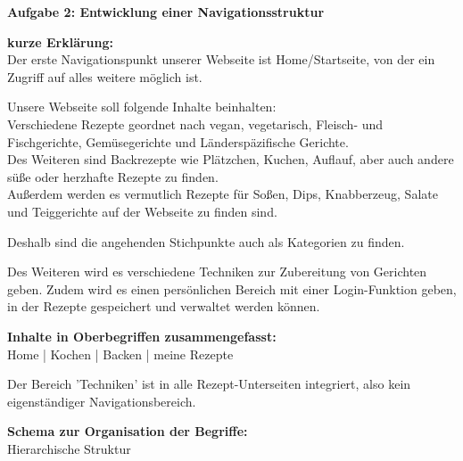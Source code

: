 \documentclass[parskip,10pt,abstracton]{scrartcl}
\renewcommand*{\maketitle}{%
	{\centering\LARGE\sffamily\bfseries Aufgabe 2: Entwicklung einer Navigationsstruktur \par}
	\vspace{3em}
}
\begin{document}
\maketitle


\textbf{kurze Erklärung:}\\
Der erste Navigationspunkt unserer Webseite ist Home/Startseite, von der ein Zugriff auf alles weitere möglich ist.

Unsere Webseite soll folgende Inhalte beinhalten:\\
Verschiedene Rezepte geordnet nach vegan, vegetarisch, Fleisch- und Fischgerichte, Gemüsegerichte und Länderspäzifische Gerichte. \\
Des Weiteren sind Backrezepte wie Plätzchen, Kuchen, Auflauf, aber auch andere süße oder herzhafte Rezepte zu finden. \\
Außerdem werden es vermutlich Rezepte für Soßen, Dips, Knabberzeug, Salate und Teiggerichte auf der Webseite zu finden sind. 

Deshalb sind die angehenden Stichpunkte auch als Kategorien zu finden. 

Des Weiteren wird es verschiedene Techniken zur Zubereitung von Gerichten geben. 
Zudem wird es einen persönlichen Bereich mit einer Login-Funktion geben, in der Rezepte gespeichert und verwaltet werden können.



\textbf{Inhalte in Oberbegriffen zusammengefasst:} \\
Home | Kochen | Backen | meine Rezepte

Der Bereich 'Techniken' ist in alle Rezept-Unterseiten integriert, also kein eigenständiger Navigationsbereich.

\textbf{Schema zur Organisation der Begriffe:}\\
Hierarchische Struktur



\end{document}
